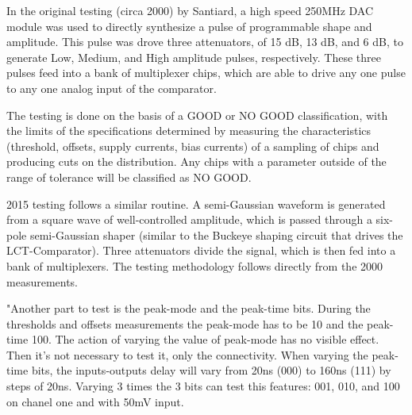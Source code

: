 \documentclass[letterpaper]{article}
\begin{document}
In the original testing (circa 2000) by Santiard, a high speed 250MHz DAC module was used to directly synthesize a pulse of programmable shape and amplitude. This pulse was drove three attenuators, of 15 dB, 13 dB, and 6 dB, to generate Low, Medium, and High amplitude pulses, respectively. These three pulses feed into a bank of multiplexer chips, which are able to drive any one pulse to any one analog input of the comparator.

The testing is done on the basis of a GOOD or NO GOOD classification, with the limits of the specifications determined by measuring the characteristics (threshold, offsets, supply currents, bias currents) of a sampling of chips and producing cuts on the distribution. Any chips with a parameter outside of the range of tolerance will be classified as NO GOOD.

%
%

2015 testing follows a similar routine. A semi-Gaussian waveform is generated from a square wave of well-controlled amplitude, which is passed through a six-pole semi-Gaussian shaper (similar to the Buckeye shaping circuit that drives the LCT-Comparator). Three attenuators divide the signal, which is then fed into a bank of multiplexers. The testing methodology follows directly from the 2000 measurements.

"Another part to test is the peak-mode and the peak-time bits. During the thresholds and offsets measurements the peak-mode has to be 10 and the peak-time 100. The action of varying the value of peak-mode has no visible effect. Then it's not necessary to test it, only the connectivity. When varying the peak-time bits, the inputs-outputs delay will vary from 20ns (000) to 160ns (111) by steps of 20ns. Varying 3 times the 3 bits can test this features: 001, 010, and 100 on chanel one and with 50mV input.
\end{document}
